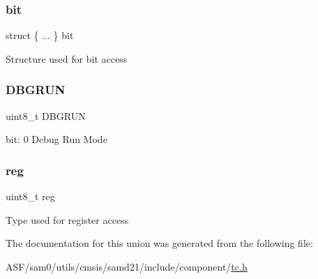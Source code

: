\subsubsection{\texorpdfstring{bit}{bit}}
{\footnotesize\ttfamily struct \{ ... \}   bit}

Structure used for bit access \mbox{\label{union_t_c___d_b_g_c_t_r_l___type_a1e1cc79f6834369b9dd0c6676a0d8781}} 
\subsubsection{\texorpdfstring{DBGRUN}{DBGRUN}}
{\footnotesize\ttfamily uint8\+\_\+t D\+B\+G\+R\+UN}

bit\+: 0 Debug Run Mode \mbox{\label{union_t_c___d_b_g_c_t_r_l___type_a9428adc9af4653a2050e2536b55dec8d}} 
\subsubsection{\texorpdfstring{reg}{reg}}
{\footnotesize\ttfamily uint8\+\_\+t reg}

Type used for register access 

The documentation for this union was generated from the following file\+:\begin{DoxyCompactItemize}
\item 
A\+S\+F/sam0/utils/cmsis/samd21/include/component/\mbox{\hyperlink{utils_2cmsis_2samd21_2include_2component_2tc_8h}{tc.\+h}}\end{DoxyCompactItemize}

